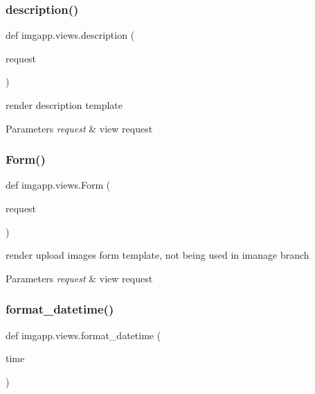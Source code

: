 \subsubsection{\texorpdfstring{description()}{description()}}
{\footnotesize\ttfamily def imgapp.\+views.\+description (\begin{DoxyParamCaption}\item[{}]{request }\end{DoxyParamCaption})}



render description template 


\begin{DoxyParams}{Parameters}
{\em request} & view request \\
\hline
\end{DoxyParams}
\mbox{\label{namespaceimgapp_1_1views_adcf4ad535b76cf41f5894ad57bcdbc43}} 
\subsubsection{\texorpdfstring{Form()}{Form()}}
{\footnotesize\ttfamily def imgapp.\+views.\+Form (\begin{DoxyParamCaption}\item[{}]{request }\end{DoxyParamCaption})}



render upload images form template, not being used in imanage branch 


\begin{DoxyParams}{Parameters}
{\em request} & view request \\
\hline
\end{DoxyParams}
\mbox{\label{namespaceimgapp_1_1views_a0bad743f7a5c8bce58dbe6250dbc105f}} 
\subsubsection{\texorpdfstring{format\+\_\+datetime()}{format\_datetime()}}
{\footnotesize\ttfamily def imgapp.\+views.\+format\+\_\+datetime (\begin{DoxyParamCaption}\item[{}]{time }\end{DoxyParamCaption})}



